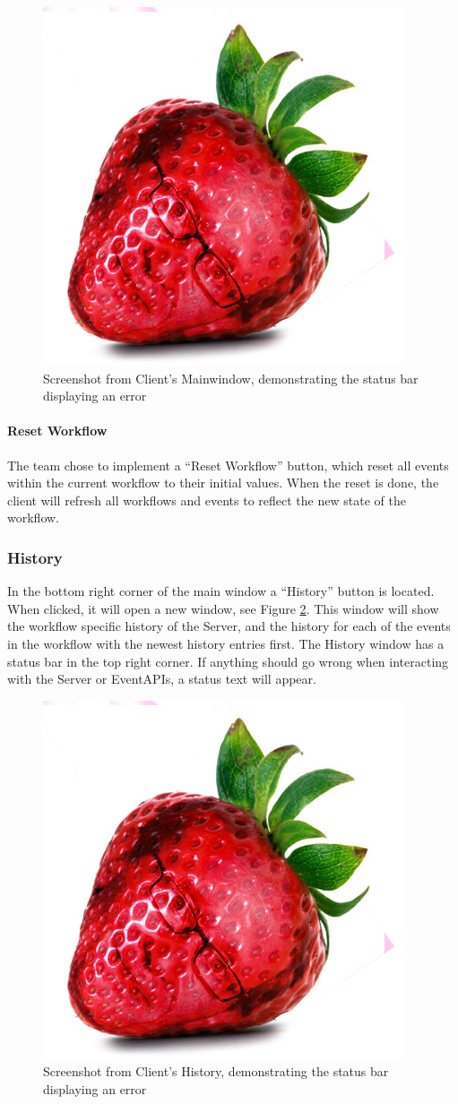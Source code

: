 \begin{figure}[h!]
\centering
\includegraphics[width=0.4\linewidth]{Figures/strawberry}
\caption{\label{fig:StatusBar}Screenshot from Client's Mainwindow, demonstrating the status bar displaying an error}
\end{figure}

\paragraph{Reset Workflow}
The team chose to implement a “Reset Workflow” button, which reset all events within the current workflow to their initial values. When the reset is done, the client will refresh all workflows and events to reflect the new state of the workflow.


\subsubsection{History}
In the bottom right corner of the main window a “History” button is located. When clicked, it will open a new window, see Figure \ref{fig:HistoryClient}. \newline
This window will show the workflow specific history of the Server, and the history for each of the events in the workflow with the newest history entries first. \newline
The History window has a status bar in the top right corner. If anything should go wrong when interacting with the Server or EventAPIs, a status text will appear.

\begin{figure}[h!]
\centering
\includegraphics[width=0.4\linewidth]{Figures/strawberry}
\caption{\label{fig:HistoryClient}Screenshot from Client's History, demonstrating the status bar displaying an error}
\end{figure}


